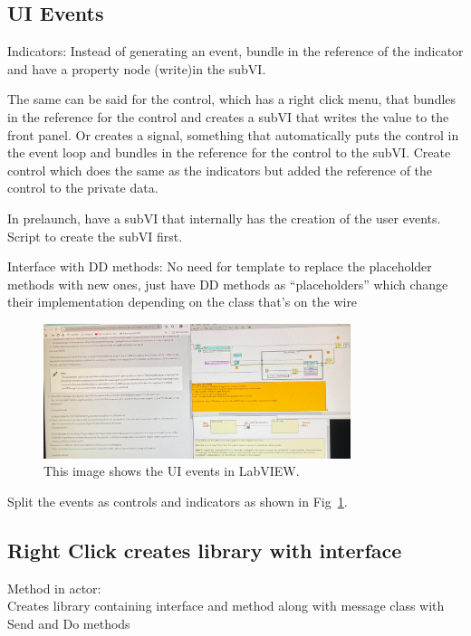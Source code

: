 \documentclass{article}
\begin{document}
\subsection{UI Events}
\label{subsec:ui-events}

Indicators: Instead of generating an event, bundle in the reference of the indicator and have a property node (write)in the subVI.

The same can be said for the control, which has a right click menu, that bundles in the reference for the control and creates a subVI that writes the value to the front panel.
Or creates a signal, something that automatically puts the control in the event loop and bundles in the reference for the control to the subVI.
Create control which does the same as the indicators but added the reference of the control to the private data.

In prelaunch, have a subVI that internally has the creation of the user events.
Script to create the subVI first.

Interface with DD methods:
No need for template to replace the placeholder methods with new ones, just have DD methods as “placeholders” which change their implementation depending on the class that's on the wire

\begin{figure}
    \centering
    \includegraphics[width=0.8\textwidth]{figures/justACS_ui_events}
    \caption{This image shows the UI events in LabVIEW.}
    \label{fig:justacs-ui-events}
\end{figure}

Split the events as controls and indicators as shown in Fig~\ref{fig:justacs-ui-events}.

\subsection{Right Click creates library with interface}

Method in actor: \\
Creates library containing interface and method along with message class with Send and Do methods
\end{document}
